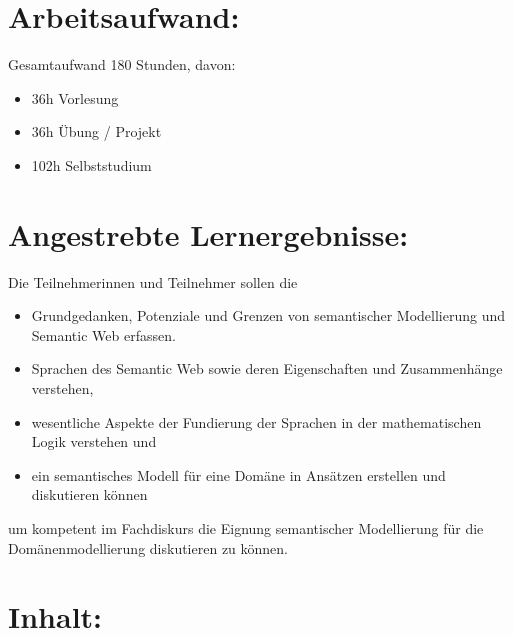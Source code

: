 \section*{Arbeitsaufwand:\label{/mi-2017/modulbeschreibungen-master/MA_WTW_Modul_Logik-und-semantische-Modellierung}}\label{arbeitsaufwandpathlabelmi-2017modulbeschreibungen-mastermaux5fwtwux5fmodulux5flogik-und-semantische-modellierung}

Gesamtaufwand 180 Stunden, davon:

\begin{itemize}
\tightlist
\item
  36h Vorlesung
\item
  36h Übung / Projekt
\item
  102h Selbststudium
\end{itemize}

\section*{Angestrebte
Lernergebnisse:\label{/mi-2017/modulbeschreibungen-master/MA_WTW_Modul_Logik-und-semantische-Modellierung}}\label{angestrebte-lernergebnissepathlabelmi-2017modulbeschreibungen-mastermaux5fwtwux5fmodulux5flogik-und-semantische-modellierung}

Die Teilnehmerinnen und Teilnehmer sollen die

\begin{itemize}
\tightlist
\item
  Grundgedanken, Potenziale und Grenzen von semantischer Modellierung
  und Semantic Web erfassen.
\item
  Sprachen des Semantic Web sowie deren Eigenschaften und Zusammenhänge
  verstehen,
\item
  wesentliche Aspekte der Fundierung der Sprachen in der mathematischen
  Logik verstehen und
\item
  ein semantisches Modell für eine Domäne in Ansätzen erstellen und
  diskutieren können
\end{itemize}

um kompetent im Fachdiskurs die Eignung semantischer Modellierung für
die Domänenmodellierung diskutieren zu können.

\section*{Inhalt:\label{/mi-2017/modulbeschreibungen-master/MA_WTW_Modul_Logik-und-semantische-Modellierung}}\label{inhaltpathlabelmi-2017modulbeschreibungen-mastermaux5fwtwux5fmodulux5flogik-und-semantische-modellierung}

